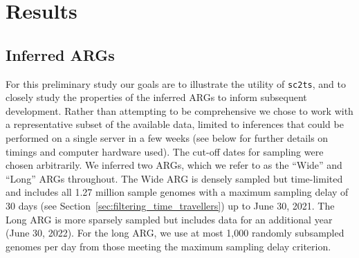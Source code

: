 \documentclass{article}
\begin{document}
\section{Results}
\subsection{Inferred ARGs}
For this preliminary study our goals are to illustrate the utility of
\texttt{sc2ts}, and to closely study the properties of the
inferred ARGs to inform subsequent development. Rather
than attempting to be comprehensive we chose to work with a
representative subset of the available data, limited to
inferences that could be performed on a single server in
a few weeks (see below for further details on timings and
computer hardware used). The cut-off dates for sampling were chosen
arbitrarily.
We inferred two ARGs, which we refer to as the
``Wide'' and ``Long'' ARGs throughout.
The Wide ARG is densely sampled but time-limited and
includes all 1.27 million sample genomes  with a
maximum sampling delay of 30 days
(see Section~\ref{sec:filtering_time_travellers})
up to June 30, 2021.
The Long ARG is more sparsely sampled but
includes data for an additional year (June 30, 2022).
For the long ARG, we use at most 1,000 randomly subsampled
genomes per day from those meeting the maximum sampling delay criterion.
\end{document}
